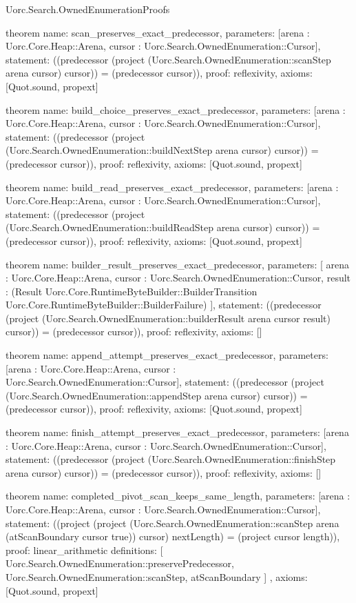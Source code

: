 \begin{lexlean}{Uorc.Search.OwnedEnumerationProofs}
\begin{semanticmodule}
theorem{
  name: scan_preserves_exact_predecessor,
  parameters: [arena : Uorc.Core.Heap::Arena, cursor : Uorc.Search.OwnedEnumeration::Cursor],
  statement: ((predecessor (project (Uorc.Search.OwnedEnumeration::scanStep arena cursor) cursor)) = (predecessor cursor)),
  proof: reflexivity{},
  axioms: [Quot.sound, propext]
}

theorem{
  name: build_choice_preserves_exact_predecessor,
  parameters: [arena : Uorc.Core.Heap::Arena, cursor : Uorc.Search.OwnedEnumeration::Cursor],
  statement: ((predecessor (project (Uorc.Search.OwnedEnumeration::buildNextStep arena cursor) cursor)) = (predecessor cursor)),
  proof: reflexivity{},
  axioms: [Quot.sound, propext]
}

theorem{
  name: build_read_preserves_exact_predecessor,
  parameters: [arena : Uorc.Core.Heap::Arena, cursor : Uorc.Search.OwnedEnumeration::Cursor],
  statement: ((predecessor (project (Uorc.Search.OwnedEnumeration::buildReadStep arena cursor) cursor)) = (predecessor cursor)),
  proof: reflexivity{},
  axioms: [Quot.sound, propext]
}

theorem{
  name: builder_result_preserves_exact_predecessor,
  parameters: [
    arena : Uorc.Core.Heap::Arena,
    cursor : Uorc.Search.OwnedEnumeration::Cursor,
    result : (Result Uorc.Core.RuntimeByteBuilder::BuilderTransition Uorc.Core.RuntimeByteBuilder::BuilderFailure)
  ],
  statement: ((predecessor (project (Uorc.Search.OwnedEnumeration::builderResult arena cursor result) cursor)) = (predecessor cursor)),
  proof: reflexivity{},
  axioms: []
}

theorem{
  name: append_attempt_preserves_exact_predecessor,
  parameters: [arena : Uorc.Core.Heap::Arena, cursor : Uorc.Search.OwnedEnumeration::Cursor],
  statement: ((predecessor (project (Uorc.Search.OwnedEnumeration::appendStep arena cursor) cursor)) = (predecessor cursor)),
  proof: reflexivity{},
  axioms: [Quot.sound, propext]
}

theorem{
  name: finish_attempt_preserves_exact_predecessor,
  parameters: [arena : Uorc.Core.Heap::Arena, cursor : Uorc.Search.OwnedEnumeration::Cursor],
  statement: ((predecessor (project (Uorc.Search.OwnedEnumeration::finishStep arena cursor) cursor)) = (predecessor cursor)),
  proof: reflexivity{},
  axioms: []
}

theorem{
  name: completed_pivot_scan_keeps_same_length,
  parameters: [arena : Uorc.Core.Heap::Arena, cursor : Uorc.Search.OwnedEnumeration::Cursor],
  statement: ((project (project (Uorc.Search.OwnedEnumeration::scanStep arena (atScanBoundary cursor true)) cursor) nextLength) = (project cursor length)),
  proof: linear_arithmetic{
    definitions: [
      Uorc.Search.OwnedEnumeration::preservePredecessor,
      Uorc.Search.OwnedEnumeration::scanStep,
      atScanBoundary
    ]
  },
  axioms: [Quot.sound, propext]
}


\end{semanticmodule}
\end{lexlean}
